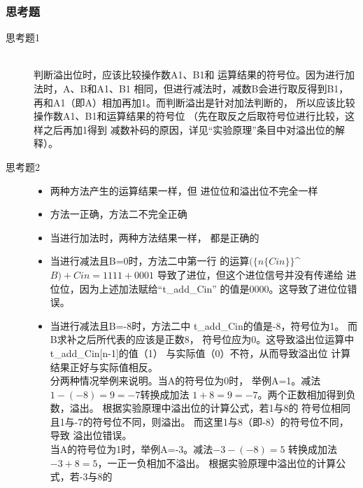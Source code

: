 \documentclass[12pt,a4paper,UTF8]{article}
\begin{document}
\subsubsection{思考题}
\begin{description}
  \item[思考题1] \hspace*{\fill} \\
        \hspace*{2em}判断溢出位时，应该比较操作数A1、B1和
        运算结果的符号位。因为进行加法时，A、B和A1、B1
        相同，但进行减法时，减数B会进行取反得到B1，
        再和A1（即A）相加再加1。而判断溢出是针对加法判断的，
        所以应该比较操作数A1、B1和运算结果的符号位
        （先在取反之后取符号位进行比较，这样之后再加1得到
        减数补码的原因，详见``实验原理''条目中对溢出位的解释）。
  \item[思考题2] \hspace*{\fill}
        \begin{itemize}
          \item 两种方法产生的运算结果一样，但
                进位位和溢出位不完全一样
          \item 方法一正确，方法二不完全正确
          \item 当进行加法时，两种方法结果一样，
                都是正确的
          \item 当进行减法且B=0时，方法二中第一行
                的运算$(\{n\{Cin\}\}$\^{}$ B) + Cin = 1111 + 0001$
                导致了进位，但这个进位信号并没有传递给
                进位位，因为上述加法赋给``t\_add\_Cin''
                的值是0000。这导致了进位位错误。
          \item 当进行减法且B=-8时，方法二中
                t\_add\_Cin的值是-8，符号位为1。
                而B求补之后所代表的应该是正数8，
                符号位应为0。这导致溢出位运算中
                t\_add\_Cin[n-1]的值（1）
                与实际值（0）不符，从而导致溢出位
                计算结果正好与实际值相反。\\
                分两种情况举例来说明。当A的符号位为0时，
                举例A=1。减法$1-(-8)=9=-7$转换成加法
                $1+8=9=-7$。两个正数相加得到负数，溢出。
                根据实验原理中溢出位的计算公式，若1与8的
                符号位相同且1与-7的符号位不同，则溢出。
                而这里1与8（即-8）的符号位不同，导致
                溢出位错误。\\
                当A的符号位为1时，举例A=-3。减法$-3-(-8)=5$
                转换成加法$-3+8=5$，一正一负相加不溢出。
                根据实验原理中溢出位的计算公式，若-3与8的

\end{itemize}
\end{description}
\end{document}
